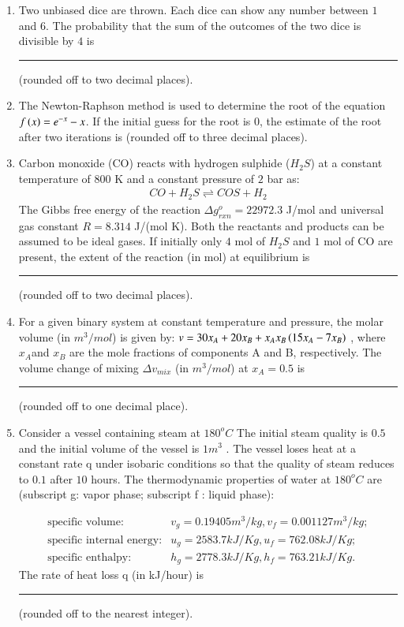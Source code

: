 \documentclass[journal,12pt,onecolumn]{IEEEtran}
\theoremstyle{remark}
\begin{document}
\begin{enumerate}
    \item Two unbiased dice are thrown. Each dice can show any number between $1$ and $6$. The probability that the sum of the outcomes of the two dice is divisible by $4$ is \rule{1cm}{0.1mm}(rounded off to two decimal places).

    \item The Newton-Raphson method is used to determine the root of the equation $f\left(x\right) = e^{-x} - x$. If the initial guess for the root is $0$, the estimate of the root after two iterations is (rounded off to three decimal places). 

    \item Carbon monoxide (CO) reacts with hydrogen sulphide ($H_2S$) at a constant temperature of $800$ K and a constant pressure of $2$ bar as: 
    \begin{align*}
        CO + H_2S \rightleftharpoons COS + H_2
    \end{align*}
    The Gibbs free energy of the reaction $\Delta g^{o}_{rxn} = 22972.3$ J/mol and universal gas constant $R = 8.314$ J/(mol K). Both the reactants and products can be assumed to be ideal gases. If initially only $4$ mol of $H_2S$ and $1$ mol of CO are present, the extent of the reaction (in mol) at equilibrium is \rule{1.5cm}{0.1mm}(rounded off to two decimal places).

    \item For a given binary system at constant temperature and pressure, the molar volume (in $m^3/mol$) is given by: $v = 30x_A + 20x_B + x_Ax_B\left(15x_A - 7x_B\right)$ , where $x_A $and $x_B$ are the mole fractions of components A and B, respectively. The volume change of mixing $\Delta v_{mix}$ (in $m^3/mol$) at $x_A = 0.5$ is \rule{1.5cm}{0.1mm}(rounded off to one decimal place). 

    \item Consider a vessel containing steam at $180^oC$ The initial steam quality is $0.5$ and the initial volume of the vessel is $1 m^3$ . The vessel loses heat at a constant rate q under isobaric conditions so that the quality of steam reduces to $0.1$ after $10$ hours. The thermodynamic properties of water at $180^oC$ are (subscript g: vapor phase; subscript f : liquid phase): 
    
    \begin{align*}
        \text{specific volume:} & v_g = 0.19405 m^3/kg,  v_f = 0.001127 m^3/kg; \\
        \text{specific internal energy:} & u_g = 2583.7 kJ/Kg,  u_f = 762.08 kJ/Kg;\\
        \text{specific enthalpy:} & h_g = 2778.3 kJ/Kg,  h_f = 763.21 kJ/Kg.
    \end{align*} 
    The rate of heat loss q (in kJ/hour) is \rule{2cm}{0.1mm}(rounded off to the nearest integer). 


\end{enumerate}
\end{document}
